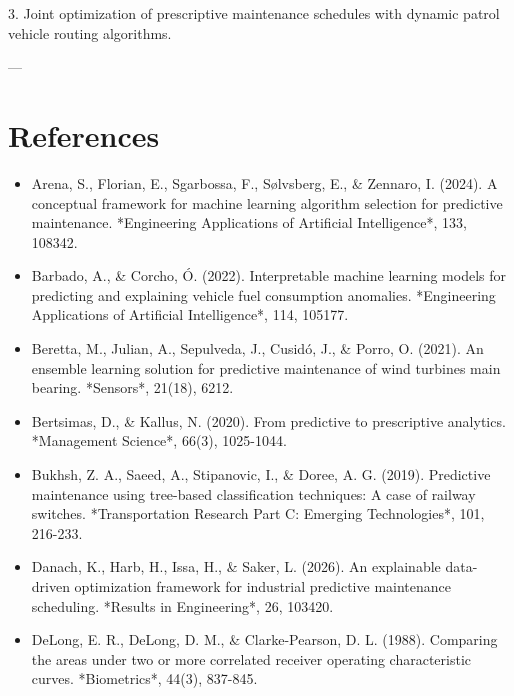 \documentclass[10pt,a4paper,journal]{article}
\begin{document}
3. Joint optimization of prescriptive maintenance schedules with dynamic patrol vehicle routing algorithms.

---

\section{References}
\begin{itemize}
\item Arena, S., Florian, E., Sgarbossa, F., Sølvsberg, E., \& Zennaro, I. (2024). A conceptual framework for machine learning algorithm selection for predictive maintenance. *Engineering Applications of Artificial Intelligence*, 133, 108342.
\end{itemize}
\begin{itemize}
\item Barbado, A., \& Corcho, Ó. (2022). Interpretable machine learning models for predicting and explaining vehicle fuel consumption anomalies. *Engineering Applications of Artificial Intelligence*, 114, 105177.
\end{itemize}
\begin{itemize}
\item Beretta, M., Julian, A., Sepulveda, J., Cusidó, J., \& Porro, O. (2021). An ensemble learning solution for predictive maintenance of wind turbines main bearing. *Sensors*, 21(18), 6212.
\end{itemize}
\begin{itemize}
\item Bertsimas, D., \& Kallus, N. (2020). From predictive to prescriptive analytics. *Management Science*, 66(3), 1025-1044.
\end{itemize}
\begin{itemize}
\item Bukhsh, Z. A., Saeed, A., Stipanovic, I., \& Doree, A. G. (2019). Predictive maintenance using tree-based classification techniques: A case of railway switches. *Transportation Research Part C: Emerging Technologies*, 101, 216-233.
\end{itemize}
\begin{itemize}
\item Danach, K., Harb, H., Issa, H., \& Saker, L. (2026). An explainable data-driven optimization framework for industrial predictive maintenance scheduling. *Results in Engineering*, 26, 103420.
\end{itemize}
\begin{itemize}
\item DeLong, E. R., DeLong, D. M., \& Clarke-Pearson, D. L. (1988). Comparing the areas under two or more correlated receiver operating characteristic curves. *Biometrics*, 44(3), 837-845.
\end{itemize}
\end{document}
